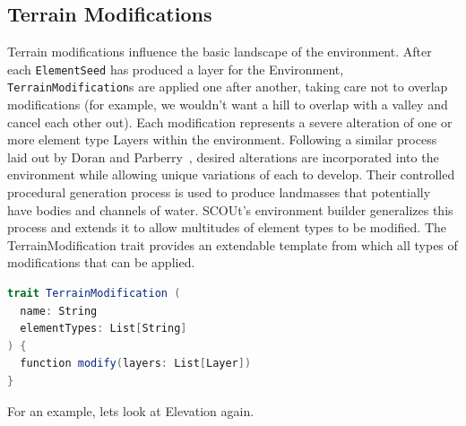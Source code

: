 \subsection{Terrain Modifications} \label{subsec:terrain_modifications}
Terrain modifications influence the basic landscape of the environment.
After each \texttt{ElementSeed} has produced a layer for the Environment, \texttt{TerrainModification}s are applied one after another, taking care not to overlap modifications (for example, we wouldn't want a hill to overlap with a valley and cancel each other out).
Each modification represents a severe alteration of one or more element type Layers within the environment.
Following a similar process laid out by Doran and Parberry~\cite{doran_controlled_2010}, desired alterations are incorporated into the environment while allowing unique variations of each to develop.
Their controlled procedural generation process is used to produce landmasses that potentially have bodies and channels of water.
SCOUt's environment builder generalizes this process and extends it to allow multitudes of element types to be modified.
The TerrainModification trait provides an extendable template from which all types of modifications that can be applied.

\begin{lstlisting}[language=Scala]
trait TerrainModification (
  name: String
  elementTypes: List[String]
) {
  function modify(layers: List[Layer])
}
\end{lstlisting}

\noindent
For an example, lets look at Elevation again.


